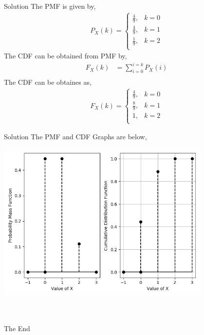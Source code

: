 \documentclass{beamer}
\providecommand{\p}[1]{\ensuremath{{P_X}\left(#1\right)}}
\providecommand{\f}[1]{\ensuremath{{F_X}\left(#1\right)}}
\begin{document}
\begin{frame}{Solution}
	The PMF is given by,
	\begin{align*}
	\p k = 
		\begin{cases}
		\frac{4}{9}, & k = 0\\
		\frac{4}{9}, & k = 1\\
		\frac{1}{9}, & k = 2\\
		\end{cases}		
	\end{align*}
	The CDF can be obtained from PMF by,
	\begin{align*}
	\f k & = \sum_{i = 0}^{i = k}\p i\\
	\end{align*}
	The CDF can be obtaines as,
	\begin{align*}
	\f k = 
		\begin{cases}
			\frac{4}{9}, & k = 0\\
			\frac{8}{9}, & k = 1\\
			1, & k = 2\\			
		\end{cases}
	\end{align*}
\end{frame}

\begin{frame}{Solution}
	The PMF and CDF Graphs are below,
	\begin{center}
		\includegraphics[width = 0.8\textwidth]{pfigs/f1.png}
	\end{center}
\end{frame}

\begin{frame}
\centering
\ \\ \ \\
\huge The End
\end{frame}
\end{document}
